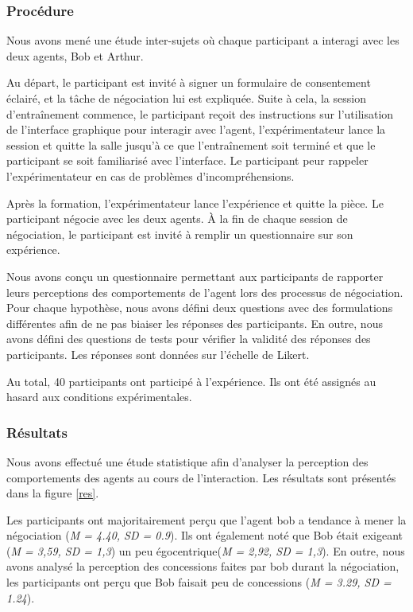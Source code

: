 {			\subsubsection{Procédure}
			
			Nous avons mené une étude inter-sujets où chaque participant a interagi avec les deux agents, Bob et Arthur.
			
			Au départ, le participant est invité à signer un formulaire de consentement éclairé, et  la tâche de négociation lui est expliquée. 
			Suite à cela, la  session d'entraînement commence, le participant reçoit des instructions sur l'utilisation de l'interface graphique pour interagir avec l'agent, l'expérimentateur lance la session et quitte la salle jusqu'à ce que l'entraînement soit terminé et que le participant se soit familiarisé avec l'interface. Le participant peur rappeler l'expérimentateur en cas de problèmes d'incompréhensions. 
			
			Après la formation, l'expérimentateur lance l'expérience et quitte la pièce. 
			Le participant négocie avec les deux agents. À la fin de chaque session de négociation, le participant est invité à remplir un questionnaire sur son expérience.
			
			Nous avons conçu un questionnaire permettant aux participants de rapporter leurs perceptions des comportements de l'agent lors des processus de négociation. Pour chaque hypothèse, nous avons défini deux questions avec des formulations différentes afin de ne pas biaiser les réponses des participants. En outre, nous avons défini des questions de tests pour vérifier la validité des réponses des participants. Les réponses sont données sur l'échelle de Likert.
			
			Au total, 40 participants ont participé à l'expérience. Ils ont été assignés au hasard aux conditions expérimentales.
			
			\subsubsection{Résultats}
			Nous avons effectué une étude statistique afin d'analyser la perception des comportements des agents au cours de l'interaction. Les résultats sont présentés dans la figure \ref{res}.
			
			Les participants ont majoritairement perçu que l'agent bob a tendance à mener la négociation (\emph {M = 4.40, SD = 0.9}). Ils ont également noté que Bob était exigeant (\emph {M = 3,59, SD = 1,3}) un peu égocentrique(\emph {M = 2,92, SD = 1,3}). En outre, nous avons analysé la perception des concessions faites par bob durant la négociation, les participants ont perçu que Bob faisait peu de concessions (\emph {M = 3.29, SD = 1.24}).
			
}
